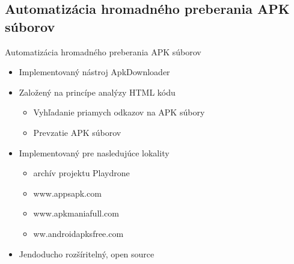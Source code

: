 \documentclass{beamer}
\begin{document}
  \subsection{Automatizácia hromadného preberania APK súborov}
  \begin{frame}[label=lists]{Automatizácia hromadného preberania APK súborov}
    \begin{itemize}
  		\item Implementovaný nástroj ApkDownloader\cite{apkdownloader}
  		\item Založený na princípe analýzy HTML kódu
  		\begin{itemize}
  		\item Vyhľadanie priamych odkazov na APK súbory
  		\item Prevzatie APK súborov
  		\end{itemize}
		\item Implementovaný pre nasledujúce lokality
  		\begin{itemize}
  		\item archív projektu Playdrone
  		\item www.appsapk.com
  		\item www.apkmaniafull.com
  		\item ww.androidapksfree.com
  		\end{itemize}
  		\item Jendoducho rozšíritelný, open source
    \end{itemize}  
  \end{frame}  
  
\end{document}
